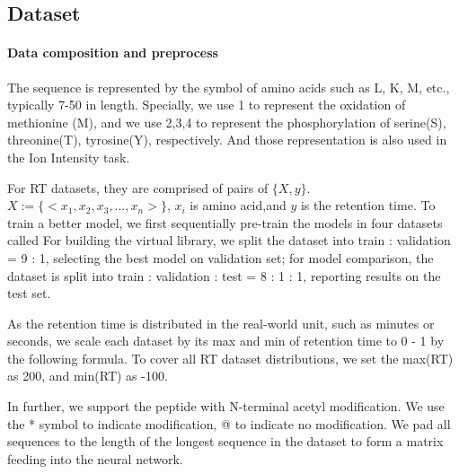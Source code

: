 
\subsection{Dataset}
\paragraph*{Data composition and preprocess}
The sequence is represented by the symbol of amino acids such as L, K, M, etc., typically 7-50
in length. Specially, we use 1 to represent the oxidation of methionine (M), and we use 2,3,4 to represent the phosphorylation of serine(S), threonine(T), tyrosine(Y), respectively. And those representation is also used in the Ion Intensity task.

For RT datasets, they are comprised of pairs of
\( \{X, y\} \). $X:= \{ <x_1, x_2, x_3,\dots, x_n> \}$, $x_i$
is amino acid,and \( y \) is the retention time. 
To train a better model, we first sequentially pre-train the models in four datasets called 
For building the virtual library, we split the dataset into train : validation = 9 : 1,
selecting the best model on validation set; for model comparison, the dataset is split into train : validation : test
= 8 : 1 : 1, reporting results on the test set.

As the retention time is distributed in the real-world unit, such as minutes or seconds, we scale each dataset by its max and min of retention time to 0 - 1 by the following formula. To cover all RT dataset distributions, we set the max(RT) as 200, and min(RT) as -100.

In further, we support the peptide with N-terminal acetyl modification. We use the * symbol to indicate modification, @ to indicate no modification. We pad all sequences to the length of the longest sequence in the dataset to form a matrix feeding into the neural network.

